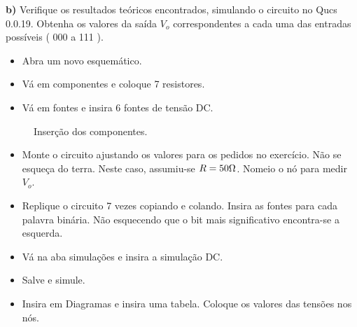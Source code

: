 \noindent\textbf{b)} Verifique os resultados teóricos encontrados, simulando o circuito no Qucs 0.0.19. Obtenha os valores da saída $V_o$ correspondentes a cada uma das entradas possíveis ( 000 a 111 ).

\begin{itemize}
  \item Abra um novo esquemático.
\end{itemize}


\begin{itemize}
  \item Vá em componentes e coloque 7 resistores.
  \item Vá em fontes e insira 6 fontes de tensão DC.
\end{itemize}


\begin{figure}[H]
  \centering
  \caption{Inserção dos componentes.}
  \label{fig:ins_comp}
\end{figure}

\begin{itemize}
  \item Monte o circuito ajustando os valores para os pedidos no exercício. Não se esqueça do terra.
    Neste caso, assumiu-se $R=50\ohm$. Nomeio o nó para medir $V_o$.
\end{itemize}

\begin{itemize}
  \item Replique o circuito 7 vezes copiando e colando. Insira as fontes para cada palavra binária. Não esquecendo que o bit mais significativo encontra-se a esquerda.
\end{itemize}

\begin{itemize}
  \item Vá na aba simulações e insira a simulação DC.
  \item Salve e simule.
\end{itemize}


\begin{itemize}
  \item Insira em Diagramas e insira uma tabela. Coloque os valores das tensões nos nós.
\end{itemize}

